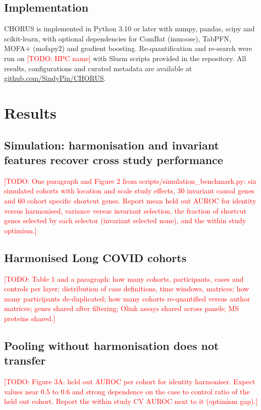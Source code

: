 \documentclass[unnumsec,webpdf,contemporary,large]{oup-authoring-template}
\newcommand{\todo}[1]{\textcolor{red}{[TODO: #1]}}
\begin{document}
\subsection{Implementation}

CHORUS is implemented in Python 3.10 or later with numpy, pandas, scipy and scikit-learn, with optional dependencies for ComBat (inmoose), TabPFN, MOFA+ (mofapy2) and gradient boosting. Re-quantification and re-search were run on \todo{HPC name} with Slurm scripts provided in the repository. All results, configurations and curated metadata are available at \href{https://github.com/SindyPin/CHORUS}{github.com/SindyPin/CHORUS}.

\section{Results}

\subsection{Simulation: harmonisation and invariant features recover cross study performance}

\todo{One paragraph and Figure 2 from scripts/simulation\_benchmark.py: six simulated cohorts with location and scale study effects, 30 invariant causal genes and 60 cohort specific shortcut genes. Report mean held out AUROC for identity versus harmonised, variance versus invariant selection, the fraction of shortcut genes selected by each selector (invariant selected none), and the within study optimism.}

\subsection{Harmonised Long COVID cohorts}

\todo{Table 1 and a paragraph: how many cohorts, participants, cases and controls per layer; distribution of case definitions, time windows, matrices; how many participants de-duplicated; how many cohorts re-quantified versus author matrices; genes shared after filtering; Olink assays shared across panels; MS proteins shared.}

\subsection{Pooling without harmonisation does not transfer}

\todo{Figure 3A: held out AUROC per cohort for identity harmoniser. Expect values near 0.5 to 0.6 and strong dependence on the case to control ratio of the held out cohort. Report the within study CV AUROC next to it (optimism gap).}
\end{document}
